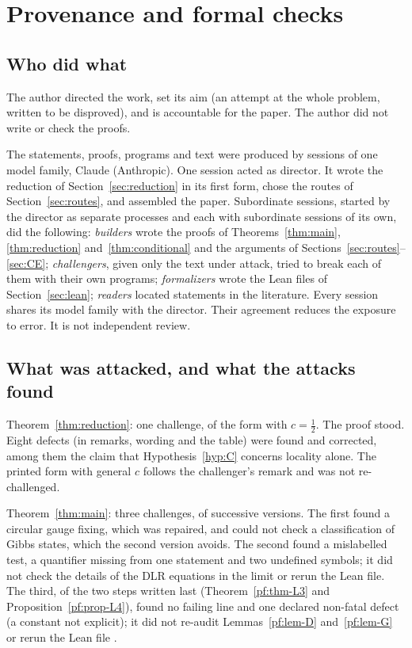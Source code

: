 \section{Provenance and formal checks}\label{sec:provenance}

\subsection{Who did what}
The author directed the work, set its aim (an attempt at the whole problem, written to be disproved), and is accountable for the paper. The author did not write or check the proofs.

The statements, proofs, programs and text were produced by sessions of one model family, Claude (Anthropic). One session acted as director. It wrote the reduction of Section~\ref{sec:reduction} in its first form, chose the routes of Section~\ref{sec:routes}, and assembled the paper. Subordinate sessions, started by the director as separate processes and each with subordinate sessions of its own, did the following: \emph{builders} wrote the proofs of Theorems~\ref{thm:main}, \ref{thm:reduction} and~\ref{thm:conditional} and the arguments of Sections~\ref{sec:routes}--\ref{sec:CE}; \emph{challengers}, given only the text under attack, tried to break each of them with their own programs; \emph{formalizers} wrote the Lean files of Section~\ref{sec:lean}; \emph{readers} located statements in the literature. Every session shares its model family with the director. Their agreement reduces the exposure to error. It is not independent review.

\subsection{What was attacked, and what the attacks found}
Theorem~\ref{thm:reduction}: one challenge, of the form with $c=\tfrac12$. The proof stood. Eight defects (in remarks, wording and the table) were found and corrected, among them the claim that Hypothesis~\ref{hyp:C} concerns locality alone. The printed form with general $c$ follows the challenger's remark and was not re-challenged.

Theorem~\ref{thm:main}: three challenges, of successive versions. The first found a circular gauge fixing, which was repaired, and could not check a classification of Gibbs states, which the second version avoids. The second found a mislabelled test, a quantifier missing from one statement and two undefined symbols; it did not check the details of the DLR equations in the limit or rerun the Lean file. The third, of the two steps written last (Theorem~\ref{pf:thm-L3} and Proposition~\ref{pf:prop-L4}), found no failing line and one declared non-fatal defect (a constant not explicit); it did not re-audit Lemmas~\ref{pf:lem-D} and~\ref{pf:lem-G} or rerun the Lean file .

